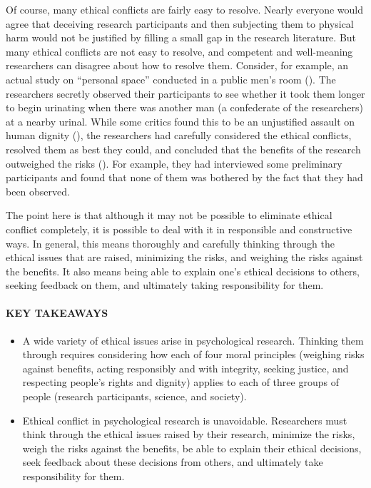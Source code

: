 \documentclass[
]{krantz}
\providecommand{\tightlist}{%
  \setlength{\itemsep}{0pt}\setlength{\parskip}{0pt}}
\begin{document}
Of course, many ethical conflicts are fairly easy to resolve. Nearly everyone would agree that deceiving research participants and then subjecting them to physical harm would not be justified by filling a small gap in the research literature. But many ethical conflicts are not easy to resolve, and competent and well-meaning researchers can disagree about how to resolve them. Consider, for example, an actual study on ``personal space'' conducted in a public men's room (). The researchers secretly observed their participants to see whether it took them longer to begin urinating when there was another man (a confederate of the researchers) at a nearby urinal. While some critics found this to be an unjustified assault on human dignity (), the researchers had carefully considered the ethical conflicts, resolved them as best they could, and concluded that the benefits of the research outweighed the risks (). For example, they had interviewed some preliminary participants and found that none of them was bothered by the fact that they had been observed.

The point here is that although it may not be possible to eliminate ethical conflict completely, it is possible to deal with it in responsible and constructive ways. In general, this means thoroughly and carefully thinking through the ethical issues that are raised, minimizing the risks, and weighing the risks against the benefits. It also means being able to explain one's ethical decisions to others, seeking feedback on them, and ultimately taking responsibility for them.

\paragraph*{KEY TAKEAWAYS}\label{key-takeaways-22}

\begin{itemize}
\tightlist
\item
  A wide variety of ethical issues arise in psychological research. Thinking them through requires considering how each of four moral principles (weighing risks against benefits, acting responsibly and with integrity, seeking justice, and respecting people's rights and dignity) applies to each of three groups of people (research participants, science, and society).
\item
  Ethical conflict in psychological research is unavoidable. Researchers must think through the ethical issues raised by their research, minimize the risks, weigh the risks against the benefits, be able to explain their ethical decisions, seek feedback about these decisions from others, and ultimately take responsibility for them.
\end{itemize}
\end{document}
